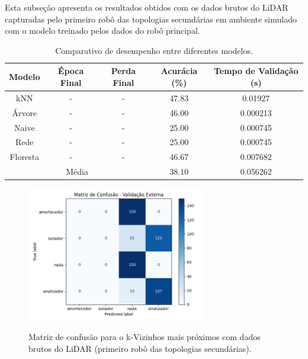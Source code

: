 Esta subseção apresenta os resultados obtidos com os dados brutos do LiDAR capturadas pelo primeiro robô das topologias secundárias em ambiente simulado com o modelo treinado pelos dados do robô principal.

\begin{table}[H]
\caption{Comparativo de desempenho entre diferentes modelos.}
\centering
\begin{tabular}{ccccc}
\hline
\textbf{Modelo} & \textbf{Época Final} & \textbf{Perda Final} & \textbf{Acurácia (\%)} & \textbf{Tempo de Validação (s)}  \\
\hline
kNN      & - & - & 47.83 & 0.01927 \\
Árvore   & - & - & 46.00 & 0.000213 \\ 
Naive    & - & - & 25.00 & 0.000745 \\ 
Rede     & - & - & 25.00 & 0.000745 \\
Floresta & - & - & 46.67 & 0.007682 \\
\hline
\multicolumn{3}{c}{Média} & 38.10 & 0.056262 \\
\hline
\end{tabular}
\fonte{}
\label{tab:comparativo_modelos_atualizado}
\end{table}

\begin{figure}[H]
\centering
\caption{Matriz de confusão para o k-Vizinhos mais próximos com dados brutos do LiDAR (primeiro robô das topologias secundárias).}
\includegraphics[width=0.7\textwidth]{figuras/Resultados/multi_primeiro_Teste2_knn.png}
\label{fig:mc_lidar_knn_robo1_t2}
\fonte{}
\end{figure}

